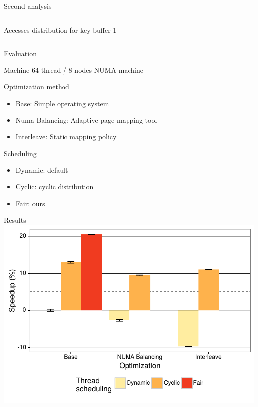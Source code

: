 \documentclass[xcolor={usenames,dvipsnames},hyperref={pdfusetitle}]{beamer}
\begin{document}
\begin{frame}{Second analysis}
\begin{columns}
\begin{column}{.45\linewidth}
            \begin{block}{}
                \centering
                Accesses distribution for key buffer 1
            \end{block}
        \end{column}
    \end{columns}
\end{frame}

\begin{frame}{Evaluation}
    \begin{block}{Machine}
        64 thread / 8 nodes NUMA machine
    \end{block}
    \pause
    \begin{block}{Optimization method}
        \begin{itemize}
            \item Base: Simple operating system
            \item Numa Balancing: Adaptive page mapping tool
            \item Interleave: Static mapping policy
        \end{itemize}
    \end{block}
    \pause
    \begin{alertblock}{Scheduling}
        \begin{itemize}
            \item Dynamic: default
            \item Cyclic: cyclic distribution
            \item Fair: ours
        \end{itemize}
    \end{alertblock}
\end{frame}

\begin{frame}{Results}
    \includegraphics[width=\linewidth]{tabarnac/is_exectime}
\end{frame}
\end{document}
